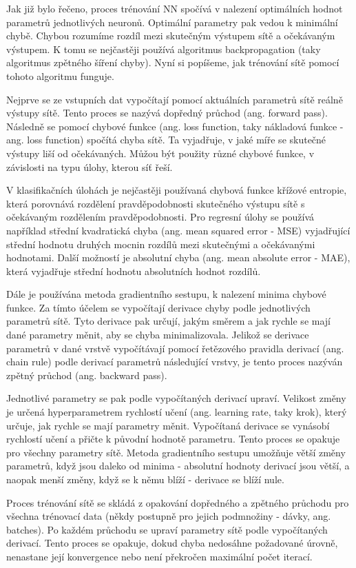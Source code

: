 Jak již bylo řečeno, proces trénování NN spočívá v nalezení optimálních hodnot
parametrů jednotlivých neuronů. Optimální parametry pak vedou k minimální
chybě. Chybou rozumíme rozdíl mezi skutečným výstupem sítě a očekávaným
výstupem. K tomu se nejčastěji používá algoritmus backpropagation (taky
algoritmus zpětného šíření chyby). Nyní si popíšeme, jak trénování sítě pomocí
tohoto algoritmu funguje.

Nejprve se ze vstupních dat vypočítají pomocí aktuálních parametrů sítě reálně
výstupy sítě. Tento proces se nazývá dopředný průchod (ang. forward pass).
Následně se pomocí chybové funkce (ang. loss function, taky nákladová funkce -
ang. loss function) spočítá chyba sítě. Ta vyjadřuje, v jaké míře se skutečné
výstupy liší od očekávaných. Můžou být použity různé chybové funkce, v
závislosti na typu úlohy, kterou síť řeší.

V klasifikačních úlohách je nejčastěji používaná chybová funkce křížové
entropie, která porovnává rozdělení pravděpodobnosti skutečného výstupu sítě s
očekávaným rozdělením pravděpodobnosti. Pro regresní úlohy se používá například
střední kvadratická chyba (ang. mean squared error - MSE) vyjadřující střední
hodnotu druhých mocnin rozdílů mezi skutečnými a očekávanými hodnotami. Další
možností je absolutní chyba (ang. mean absolute error - MAE), která vyjadřuje
střední hodnotu absolutních hodnot rozdílů.

Dále je používána metoda gradientního sestupu, k nalezení minima chybové
funkce. Za tímto účelem se vypočítají derivace chyby podle jednotlivých
parametrů sítě. Tyto derivace pak určují, jakým směrem a jak rychle se mají
dané parametry měnit, aby se chyba minimalizovala. Jelikož se derivace
parametrů v dané vrstvě vypočítávají pomocí řetězového pravidla derivací (ang.
chain rule) podle derivací parametrů následující vrstvy, je tento proces
nazýván zpětný průchod (ang. backward pass).

Jednotlivé parametry se pak podle vypočítaných derivací upraví. Velikost změny
je určená hyperparametrem rychlostí učení (ang. learning rate, taky krok),
který určuje, jak rychle se mají parametry měnit. Vypočítaná derivace se
vynásobí rychlostí učení a přičte k původní hodnotě parametru. Tento proces se
opakuje pro všechny parametry sítě. Metoda gradientního sestupu umožňuje větší
změny parametrů, když jsou daleko od minima - absolutní hodnoty derivací jsou
větší, a naopak menší změny, když se k němu blíží - derivace se blíží nule.

Proces trénování sítě se skládá z opakování dopředného a zpětného průchodu pro
všechna trénovací data (někdy postupně pro jejich podmnožiny - dávky, ang.
batches). Po každém průchodu se upraví parametry sítě podle vypočítaných
derivací. Tento proces se opakuje, dokud chyba nedosáhne požadované úrovně,
nenastane její konvergence nebo není překročen maximální počet iterací.

